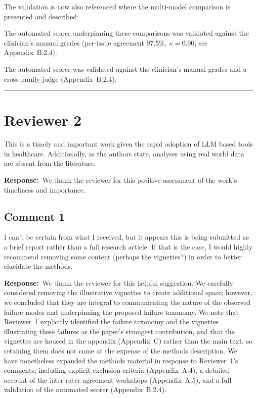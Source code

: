 \documentclass[11pt,a4paper]{article}
\newcounter{rcomment}
\newcommand{\response}{\noindent\textbf{Response:}\ }
\begin{document}
The validation is now also referenced where the multi-model comparison is presented and described:

\begin{manuscriptchange}
The automated scorer underpinning these comparisons was validated against the clinician's manual grades (per-issue agreement 97.5\%, $\kappa = 0.90$; see Appendix~B.2.4).
\end{manuscriptchange}

\begin{manuscriptchange}
The automated scorer was validated against the clinician's manual grades and a cross-family judge (Appendix~B.2.4).
\end{manuscriptchange}

\vspace{1em}
\hrule

\section*{Reviewer 2}

\begin{reviewercomment}
This is a timely and important work given the rapid adoption of LLM based tools in healthcare. Additionally, as the authors state, analyses using real world data are absent from the literature.
\end{reviewercomment}

\response We thank the reviewer for this positive assessment of the work's timeliness and importance.

\subsection*{Comment 1}
\begin{reviewercomment}
I can't be certain from what I received, but it appears this is being submitted as a brief report rather than a full research article. If that is the case, I would highly recommend removing some content (perhaps the vignettes?) in order to better elucidate the methods.
\end{reviewercomment}

\response We thank the reviewer for this helpful suggestion. We carefully considered removing the illustrative vignettes to create additional space; however, we concluded that they are integral to communicating the nature of the observed failure modes and underpinning the proposed failure taxonomy. We note that Reviewer~1 explicitly identified the failure taxonomy and the vignettes illustrating these failures as the paper's strongest contribution, and that the vignettes are housed in the appendix (Appendix~C) rather than the main text, so retaining them does not come at the expense of the methods description. We have nonetheless expanded the methods material in response to Reviewer~1's comments, including explicit exclusion criteria (Appendix~A.4), a detailed account of the inter-rater agreement workshops (Appendix~A.5), and a full validation of the automated scorer (Appendix~B.2.4).
\end{document}
